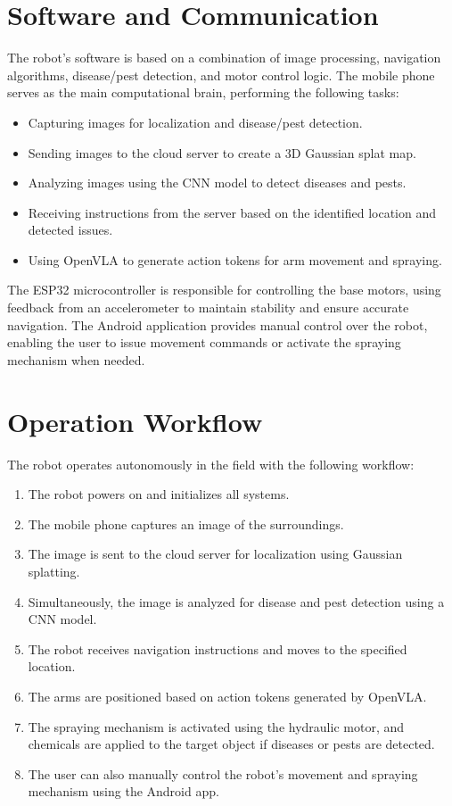 \section{Software and Communication}

The robot's software is based on a combination of image processing, navigation algorithms, disease/pest detection, and motor control logic. The mobile phone serves as the main computational brain, performing the following tasks:

\begin{itemize}
    \item Capturing images for localization and disease/pest detection.
    \item Sending images to the cloud server to create a 3D Gaussian splat map.
    \item Analyzing images using the CNN model to detect diseases and pests.
    \item Receiving instructions from the server based on the identified location and detected issues.
    \item Using OpenVLA to generate action tokens for arm movement and spraying.
\end{itemize}

The ESP32 microcontroller is responsible for controlling the base motors, using feedback from an accelerometer to maintain stability and ensure accurate navigation. The Android application provides manual control over the robot, enabling the user to issue movement commands or activate the spraying mechanism when needed.

\section{Operation Workflow}

The robot operates autonomously in the field with the following workflow:

\begin{enumerate}
    \item The robot powers on and initializes all systems.
    \item The mobile phone captures an image of the surroundings.
    \item The image is sent to the cloud server for localization using Gaussian splatting.
    \item Simultaneously, the image is analyzed for disease and pest detection using a CNN model.
    \item The robot receives navigation instructions and moves to the specified location.
    \item The arms are positioned based on action tokens generated by OpenVLA.
    \item The spraying mechanism is activated using the hydraulic motor, and chemicals are applied to the target object if diseases or pests are detected.
    \item The user can also manually control the robot's movement and spraying mechanism using the Android app.
\end{enumerate}

